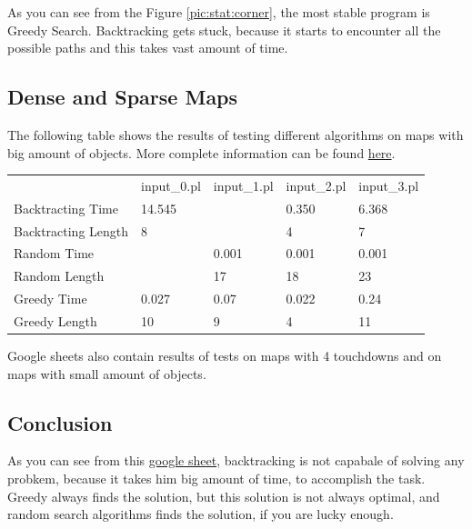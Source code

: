 \documentclass[a4apper,11pt]{article}
\begin{document}
As you can see from the Figure \ref{pic:stat:corner}, the most stable program is Greedy Search. Backtracking gets stuck, because it starts to encounter all the possible paths and this takes vast amount of time.

\subsection{Dense and Sparse Maps}
The following table shows the results of testing different algorithms on maps with big amount of objects. More complete information can be found \href{https://docs.google.com/spreadsheets/d/11Lfx49SPcEGMPLgSRwufFaIkQ5py8Cflug3j2oR3fC8/edit?usp=sharing}{here}.

\begin{table}[h]
    \begin{tabular}{lllll}
                        & input\_0.pl              & input\_1.pl              & input\_2.pl & input\_3.pl \\
    Backtracting Time   & 14.545                   & \cellcolor[HTML]{9B9B9B} & 0.350       & 6.368       \\
    Backtracting Length & 8                        & \cellcolor[HTML]{9B9B9B} & 4           & 7           \\
    Random Time         & \cellcolor[HTML]{9B9B9B} & 0.001                    & 0.001       & 0.001       \\
    Random Length       & \cellcolor[HTML]{9B9B9B} & 17                       & 18          & 23          \\
    Greedy Time         & 0.027                    & 0.07                     & 0.022       & 0.24        \\
    Greedy Length       & 10                       & 9                        & 4           & 11         
    \end{tabular}
\end{table}

Google sheets also contain results of tests on maps with 4 touchdowns and on maps with small amount of objects.

\subsection{Conclusion}
As you can see from this \href{https://docs.google.com/spreadsheets/d/11Lfx49SPcEGMPLgSRwufFaIkQ5py8Cflug3j2oR3fC8/edit?usp=sharing}{google sheet}, backtracking is not capabale of solving any probkem, because it takes him big amount of time, to accomplish the task. Greedy always finds the solution, but this solution is not always optimal, and random search algorithms finds the solution, if you are lucky enough.
\end{document}

